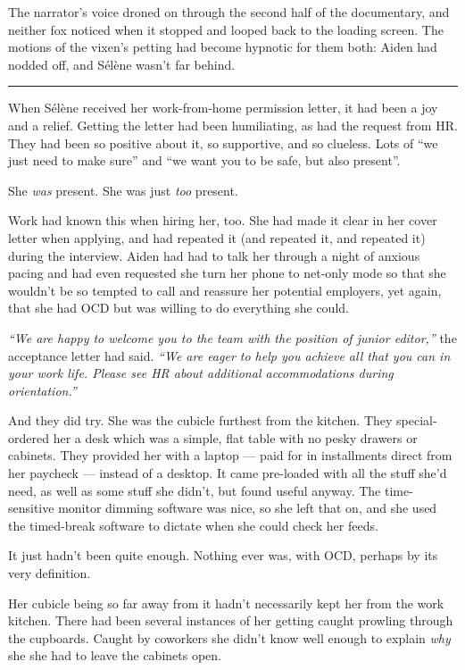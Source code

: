 The narrator's voice droned on through the second half of the documentary, and neither fox noticed when it stopped and looped back to the loading screen. The motions of the vixen's petting had become hypnotic for them both: Aiden had nodded off, and Sélène wasn't far behind.

\begin{center}\rule{0.5\linewidth}{\linethickness}\end{center}

When Sélène received her work-from-home permission letter, it had been a joy and a relief. Getting the letter had been humiliating, as had the request from HR. They had been so positive about it, so supportive, and so clueless. Lots of ``we just need to make sure'' and ``we want you to be safe, but also present''.

She \emph{was} present. She was just \emph{too} present.

Work had known this when hiring her, too. She had made it clear in her cover letter when applying, and had repeated it (and repeated it, and repeated it) during the interview. Aiden had had to talk her through a night of anxious pacing and had even requested she turn her phone to net-only mode so that she wouldn't be so tempted to call and reassure her potential employers, yet again, that she had OCD but was willing to do everything she could.

\emph{``We are happy to welcome you to the team with the position of junior editor,''} the acceptance letter had said. \emph{``We are eager to help you achieve all that you can in your work life. Please see HR about additional accommodations during orientation.''}

And they did try. She was the cubicle furthest from the kitchen. They special-ordered her a desk which was a simple, flat table with no pesky drawers or cabinets. They provided her with a laptop --- paid for in installments direct from her paycheck --- instead of a desktop. It came pre-loaded with all the stuff she'd need, as well as some stuff she didn't, but found useful anyway. The time-sensitive monitor dimming software was nice, so she left that on, and she used the timed-break software to dictate when she could check her feeds.

It just hadn't been quite enough. Nothing ever was, with OCD, perhaps by its very definition.

Her cubicle being so far away from it hadn't necessarily kept her from the work kitchen. There had been several instances of her getting caught prowling through the cupboards. Caught by coworkers she didn't know well enough to explain \emph{why} she she had to leave the cabinets open.

